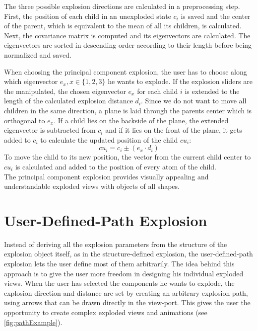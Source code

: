 \documentclass[draft,final]{vutinfth} %
\begin{document}
\par The three possible explosion directions are calculated in a preprocessing step. First, the position of each child in an unexploded state $c_i$ is saved and the center of the parent, which is equivalent to the mean of all its children, is calculated. Next, the covariance matrix is computed and its eigenvectors are calculated. The eigenvectors are sorted in descending order according to their length before being normalized and saved.

\par When choosing the principal component explosion, the user has to choose along which eigenvector $e_x, x \in \{1,2,3\}$ he wants to explode. If the explosion sliders are the manipulated, the chosen eigenvector $e_x$ for each child $i$ is extended to the length of the calculated explosion distance $d_i$. Since we do not want to move all children in the same direction, a plane is laid through the parents center which is orthogonal to $e_x$. If a child lies on the backside of the plane, the extended eigenvector is subtracted from $c_i$ and if it lies on the front of the plane, it gets added to $c_i$ to calculate the updated position of the child $cu_i$: 
\begin{equation}
\label{eq:cuPCA}
cu_i = c_i \pm (e_x \cdot d_i)
\end{equation}
To move the child to its new position, the vector from the current child center to $cu_i$ is calculated and added to the position of every atom of the child. 
\\ The principal component explosion provides visually appealing and understandable exploded views with objects of all shapes.

\section{User-Defined-Path Explosion}
\label{sec:methodPath}
Instead of deriving all the explosion parameters from the structure of the explosion object itself, as in the structure-defined explosion, the user-defined-path explosion lets the user define most of them arbitrarily.
The idea behind this approach is to give the user more freedom in designing his individual exploded views.
When the user has selected the components he wants to explode, the explosion direction and distance are set by creating an arbitrary explosion path, using arrows that can be drawn directly in the view-port.
This gives the user the opportunity to create complex exploded views and animations (see \autoref{fig:pathExample}).
\end{document}
